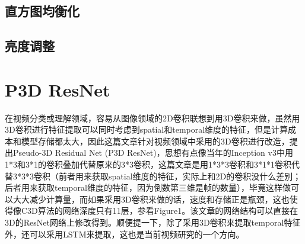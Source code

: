 
\subsection{直方图均衡化}


\subsection{亮度调整}

\section{P3D ResNet}

在视频分类或理解领域，容易从图像领域的2D卷积联想到用3D卷积来做，虽然用3D卷积进行特征提取可以同时考虑到spatial和temporal维度的特征，但是计算成本和模型存储都太大，因此这篇文章针对视频领域中采用的3D卷积进行改造，提出Pseudo-3D Residual Net (P3D ResNet)，思想有点像当年的Inception v3中用1*3和3*1的卷积叠加代替原来的3*3卷积，这篇文章是用1*3*3卷积和3*1*1卷积代替3*3*3卷积（前者用来获取spatial维度的特征，实际上和2D的卷积没什么差别；后者用来获取temporal维度的特征，因为倒数第三维是帧的数量），毕竟这样做可以大大减少计算量，而如果采用3D卷积来做的话，速度和存储正是瓶颈，这也使得像C3D算法的网络深度只有11层，参看Figure1。该文章的网络结构可以直接在3D的ResNet网络上修改得到。顺便提一下，除了采用3D卷积来提取temporal特征外，还可以采用LSTM来提取，这也是当前视频研究的一个方向。

